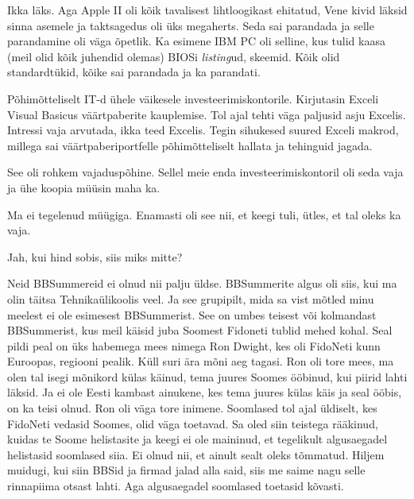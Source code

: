 
Ikka läks. Aga Apple II oli kõik tavalisest 
lihtloogikast ehitatud, Vene kivid läksid sinna asemele ja taktsagedus oli üks 
megaherts. Seda sai parandada ja selle parandamine oli väga õpetlik. Ka 
esimene IBM PC oli selline, kus tulid kaasa (meil olid 
kõik juhendid olemas)  BIOSi \emph{listing}ud, skeemid. Kõik olid 
standardtükid, kõike sai parandada ja ka parandati. 


Põhimõtteliselt IT-d ühele väikesele investeerimiskontorile. Kirjutasin 
Exceli Visual Basicus väärtpaberite 
kauplemise. Tol ajal tehti väga paljusid asju Excelis. Intressi vaja arvutada, 
ikka teed Excelis. Tegin sihukesed suured Exceli makrod, millega sai 
väärtpaberiportfelle põhimõtteliselt hallata ja tehinguid jagada. 


See oli rohkem vajaduspõhine. Sellel meie enda investeerimiskontoril oli seda 
vaja ja ühe koopia müüsin maha ka. 


Ma ei  tegelenud müügiga. Enamasti oli see nii, et keegi tuli, ütles, et tal 
oleks ka vaja. 


Jah, kui hind sobis, siis miks mitte?


Neid BBSummereid ei olnud nii palju üldse. BBSummerite algus  oli siis, kui ma 
olin täitsa Tehnikaülikoolis veel. Ja see grupipilt, mida sa vist 
mõtled minu  
meelest ei ole esimesest BBSummerist. See on umbes teisest või kolmandast 
BBSummerist, kus meil käisid juba Soomest Fidoneti tublid mehed kohal. Seal 
pildi peal on üks habemega mees nimega Ron Dwight, kes 
oli FidoNeti kunn Euroopas, regiooni pealik. Küll suri ära mõni aeg tagasi. Ron 
oli tore mees, ma olen tal isegi mõnikord külas käinud, tema juures Soomes 
ööbinud, kui piirid lahti läksid. Ja ei ole Eesti kambast ainukene, kes tema 
juures külas käis ja seal ööbis, on ka teisi olnud. Ron oli väga tore inimene. 
Soomlased tol ajal üldiselt, kes FidoNeti vedasid Soomes, olid väga toetavad. 
Sa oled siin teistega rääkinud, kuidas te Soome helistasite ja keegi ei ole 
maininud, et tegelikult algusaegadel helistasid soomlased siia. Ei olnud nii, 
et ainult sealt oleks tõmmatud. Hiljem muidugi, kui siin BBSid ja firmad jalad 
alla said, siis me saime nagu selle rinnapiima otsast lahti. Aga algusaegadel 
soomlased toetasid kõvasti. 

